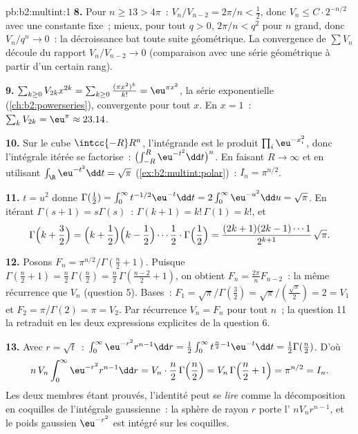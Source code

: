 \begin{solution}{pb:b2:multint:1}
\textbf{8.} Pour $n \geq 13 > 4\pi$~: $V_n/V_{n-2} = 2\pi/n <
\tfrac12$, donc $V_{n} \leq C\cdot 2^{-n/2}$ avec une constante
fixe~; mieux, pour tout $q > 0$, $2\pi/n < q^2$ pour $n$ grand,
donc $V_n/q^n \to 0$~: la décroissance bat toute suite géométrique.
La convergence de $\sum V_n$ découle du rapport
$V_n/V_{n-2} \to 0$ (comparaison avec une série géométrique à partir
d'un certain rang).

\textbf{9.} $\sum_{k\geq0}V_{2k}x^{2k} =
\sum_{k\geq0}\frac{(\pi x^2)^k}{k!} = \eu^{\pi x^2}$, la
série exponentielle (\cref{ch:b2:powerseries}), convergente pour
tout $x$. En $x = 1$~: $\sum_kV_{2k} = \eu^\pi \approx
23.14$.

\textbf{10.} Sur le cube $\intcc{-R}R^n$, l'intégrande est le
produit $\prod_i\eu^{-x_i^2}$, donc l'intégrale itérée se
factorise~: $\bigl(\int_{-R}^R\eu^{-t^2}\dd t\bigr)^n$.
En faisant $R \to \infty$ et en utilisant
$\int_\R\eu^{-t^2}\dd t = \sqrt\pi$
(\cref{ex:b2:multint:polar})~: $I_n = \pi^{n/2}$.

\textbf{11.} $t = u^2$ donne $\Gamma(\tfrac12) =
\int_0^\infty t^{-1/2}\eu^{-t}\dd t =
2\int_0^\infty\eu^{-u^2}\dd u = \sqrt\pi$. En itérant
$\Gamma(s+1) = s\Gamma(s)$~: $\Gamma(k+1) = k!\,\Gamma(1) =
k!$, et
\[
\Gamma\Bigl(k + \frac32\Bigr)
= \Bigl(k + \frac12\Bigr)\Bigl(k - \frac12\Bigr)\cdots
\frac12\cdot\Gamma\Bigl(\frac12\Bigr)
= \frac{(2k+1)(2k-1)\cdots1}{2^{k+1}}\,\sqrt\pi .
\]

\textbf{12.} Posons $F_n = \pi^{n/2}/\Gamma(\frac n2 + 1)$.
Puisque $\Gamma(\frac n2 + 1) = \frac n2\,\Gamma(\frac n2) =
\frac n2\,\Gamma(\frac{n-2}2 + 1)$, on obtient $F_n =
\frac{2\pi}nF_{n-2}$~: la même récurrence que $V_n$ (question
5). Bases~: $F_1 = \sqrt\pi/\Gamma(\frac32) =
\sqrt\pi/(\frac{\sqrt\pi}2) = 2 = V_1$ et $F_2 =
\pi/\Gamma(2) = \pi = V_2$. Par récurrence $V_n = F_n$ pour tout
$n$~; la question 11 la retraduit en les deux expressions explicites
de la question 6.

\textbf{13.} Avec $r = \sqrt t$~: $\int_0^\infty
\eu^{-r^2}r^{n-1}\dd r = \frac12\int_0^\infty
t^{\frac n2 - 1}\eu^{-t}\dd t = \frac12\Gamma(\frac n2)$.
D'où
\[
n\,V_n\int_0^\infty\eu^{-r^2}r^{n-1}\dd r
= V_n\cdot\frac n2\,\Gamma\Bigl(\frac n2\Bigr)
= V_n\,\Gamma\Bigl(\frac n2 + 1\Bigr) = \pi^{n/2} = I_n .
\]
Les deux membres étant prouvés, l'identité peut se \emph{lire} comme
la décomposition en coquilles de l'intégrale gaussienne~: la sphère
de rayon $r$ porte l' $nV_nr^{n-1}$, et le poids
gaussien $\eu^{-r^2}$ est intégré sur les coquilles.


\end{solution}
